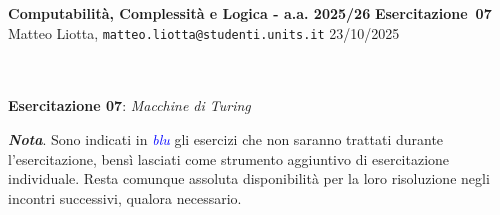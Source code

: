 \documentclass[a4paper,10pt]{article}
\makeatletter
\newcommand{\EsercitazioneNum}{07}
\newcommand{\Data}{23/10/2025}
\newcommand{\DocType}{Esercitazione} %
\newcommand{\FullTitle}{\DocType\ \EsercitazioneNum}
\newcommand{\Header}{
\noindent
  \small \textbf{Computabilità, Complessità e Logica - a.a. 2025/26} \hfill \textbf{\FullTitle} \\[0.2cm]
  \scriptsize Matteo Liotta, \texttt{matteo.liotta@studenti.units.it} \hfill \Data \\[0.2cm]
  \noindent\makebox[\linewidth]{\rule{\linewidth}{0.4pt}} \\[0.3cm]}
\makeatother
\begin{document}
\footnotesize  %
\Header\\[0.7cm]





\noindent\Large \textbf{Esercitazione 07}: \textit{Macchine di Turing}\\[0cm]

\begin{osservazioni}
    \textbf{\textit{Nota}}. Sono indicati in \textcolor{blue}{\textit{blu}} gli esercizi che non saranno trattati durante l'esercitazione, bensì lasciati come strumento aggiuntivo di esercitazione individuale. Resta comunque assoluta disponibilità per la loro risoluzione negli incontri successivi, qualora necessario.
\end{osservazioni}
\end{document}
